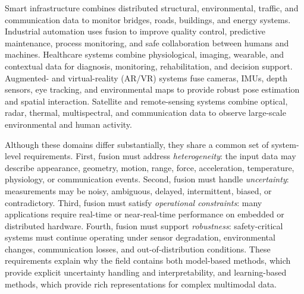 Smart infrastructure combines distributed structural, environmental, traffic, and communication data to monitor bridges, roads, buildings, and energy systems. Industrial automation uses fusion to improve quality control, predictive maintenance, process monitoring, and safe collaboration between humans and machines. Healthcare systems combine physiological, imaging, wearable, and contextual data for diagnosis, monitoring, rehabilitation, and decision support. Augmented- and virtual-reality (AR/VR) systems fuse cameras, IMUs, depth sensors, eye tracking, and environmental maps to provide robust pose estimation and spatial interaction. Satellite and remote-sensing systems combine optical, radar, thermal, multispectral, and communication data to observe large-scale environmental and human activity.

Although these domains differ substantially, they share a common set of system-level requirements. First, fusion must address \emph{heterogeneity}: the input data may describe appearance, geometry, motion, range, force, acceleration, temperature, physiology, or communication events. Second, fusion must handle \emph{uncertainty}: measurements may be noisy, ambiguous, delayed, intermittent, biased, or contradictory. Third, fusion must satisfy \emph{operational constraints}: many applications require real-time or near-real-time performance on embedded or distributed hardware. Fourth, fusion must support \emph{robustness}: safety-critical systems must continue operating under sensor degradation, environmental changes, communication losses, and out-of-distribution conditions. These requirements explain why the field contains both model-based methods, which provide explicit uncertainty handling and interpretability, and learning-based methods, which provide rich representations for complex multimodal data.

